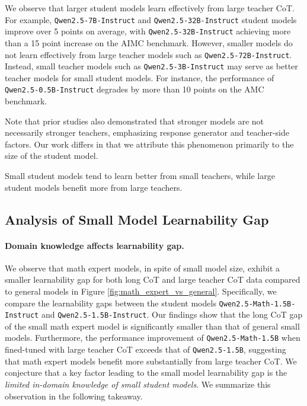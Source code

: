 We observe that larger student models learn effectively from large teacher CoT. 
For example, \texttt{Qwen2.5-7B-Instruct} and \texttt{Qwen2.5-32B-Instruct} student models improve over 5 points on average, with \texttt{Qwen2.5-32B-Instruct} achieving more than a 15 point increase on the AIMC benchmark. 
However, smaller models do not learn effectively from large teacher models such as \texttt{Qwen2.5-72B-Instruct}. 
Instead, small teacher models such as \texttt{Qwen2.5-3B-Instruct} may serve as better teacher models for small student models.
For instance, the performance of \texttt{Qwen2.5-0.5B-Instruct} degrades by more than 10 points on the AMC benchmark.


Note that prior studies \citep{kim2024evaluatinglanguagemodelssynthetic} also demonstrated that stronger models are not necessarily stronger teachers, 
emphasizing response generator and teacher-side factors. Our work differs in that we attribute this phenomenon primarily to the size of the student model.


\begin{AIbox}{}
Small student models tend to learn better from small teachers, while large student models benefit more from large teachers.
\end{AIbox}





\subsection{Analysis of Small Model Learnability Gap}
\label{More Analysis Results}


\paragraph{Domain knowledge affects learnability gap.}

We observe that math expert models, in spite of small model size,  exhibit a smaller learnability gap for both long CoT and large teacher CoT data compared to general models in Figure \ref{fig:math_expert_vs_general}. 
Specifically, we compare the learnability gaps between the student models \texttt{Qwen2.5-Math-1.5B-Instruct} and \texttt{Qwen2.5-1.5B-Instruct}. Our findings show that the long CoT gap of the small math expert model is significantly smaller than that of general small models. 
Furthermore, the performance improvement of \texttt{Qwen2.5-Math-1.5B} when fined-tuned with large teacher CoT exceeds that of \texttt{Qwen2.5-1.5B}, suggesting that math expert models benefit more substantially from large teacher CoT. We conjecture that a key factor leading to the small model learnability gap is the \textit{limited in-domain knowledge of small student models}.
We summarize this observation in the following takeaway.

